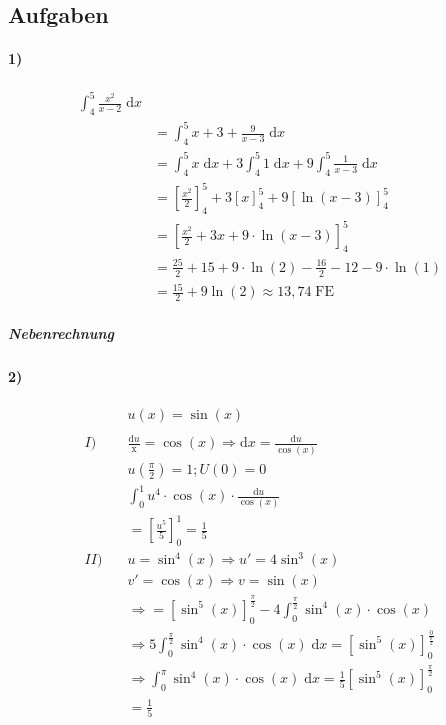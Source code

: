 \subsection{Aufgaben}

\paragraph{1)}

\begin{align*}
    \int_4^5 \frac{x^2}{x-2} \;\mathrm{d}x \\
    &= \int_4^5 x+3 + \frac{9}{x-3} \;\mathrm{d}x \\
    &= \int_4^5 x \;\mathrm{d}x + 3 \int_4^5 1 \;\mathrm{d}x + 9 \int_4^5 \frac{1}{x-3} \;\mathrm{d}x \\
    &= \left[ \frac{x^2}{2} \right]_4^5 + 3 [x]_4^5 + 9 [\ln (x-3)]_4^5 \\
    &= \left[ \frac{x^2}{2} + 3x + 9 \cdot \ln(x-3) \right]_4^5 \\
    &= \frac{25}{2} + 15 + 9 \cdot \ln(2) - \frac{16}{2} - 12 -9 \cdot \ln(1) \\
    &= \frac{15}{2} + 9 \ln(2) \approx 13,74\;\mathrm{FE}
\end{align*}


\subparagraph{Nebenrechnung}


\paragraph{2)}

\begin{align*}
    &u(x) = \sin(x) \\
    \\
    I)\quad &\frac{\mathrm{d}u}{\mathrm{x}} = \cos(x) \Rightarrow \mathrm{d}x = \frac{\mathrm{d}u}{\cos(x)} \\
    &u(\frac{\pi}{2}) = 1; U(0) = 0 \\
    &\int_0^1 u^4 \cdot \cos(x) \cdot \frac{\mathrm{d}u}{\cos(x)} \\
    &= \left[ \frac{u^5}{5} \right]_0^1 = \frac{1}{5} \\
    II)\quad &u = \sin^4(x) \Rightarrow u' = 4 \sin^3 (x) \\
    &v' = \cos(x) \Rightarrow v = \sin(x) \\
    &\Rightarrow = \left[ \sin^5(x) \right]_0^{\frac{\pi}{2}} - 4 \int_0^{\frac{\pi}{2}} \sin^4 (x) \cdot \cos(x) \\
    &\Rightarrow 5 \int_0^\frac{\pi}{2} \sin^4(x) \cdot \cos(x) \;\mathrm{d}x = \left[ \sin^5(x) \right]_0^\frac{0}{\frac{\pi}{2}} \\
    &\Rightarrow \int_0^\pi \sin^4(x) \cdot \cos(x) \;\mathrm{d}x = \frac{1}{5} \left[ \sin^5(x) \right]_0^\frac{\pi}{2} \\
    &= \frac{1}{5}
\end{align*}

